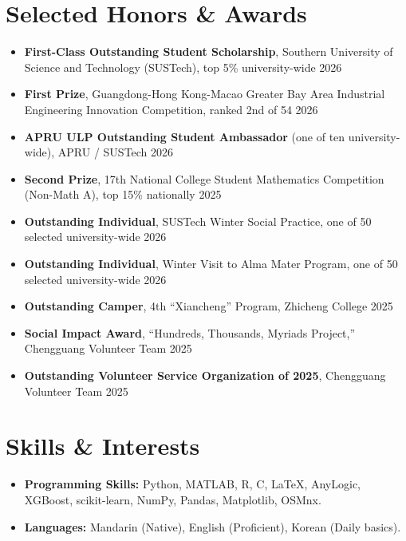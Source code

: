\documentclass[10pt,a4paper]{article}
\begin{document}
\section{Selected Honors \& Awards}
\begin{itemize}
    \item \textbf{First-Class Outstanding Student Scholarship}, Southern University of Science and Technology (SUSTech), top 5\% university-wide \hfill 2026
    \item \textbf{First Prize}, Guangdong-Hong Kong-Macao Greater Bay Area Industrial Engineering Innovation Competition, ranked 2nd of 54 \hfill 2026
    \item \textbf{APRU ULP Outstanding Student Ambassador} (one of ten university-wide), APRU / SUSTech \hfill 2026
    \item \textbf{Second Prize}, 17th National College Student Mathematics Competition (Non-Math A), top 15\% nationally \hfill 2025
    \item \textbf{Outstanding Individual}, SUSTech Winter Social Practice, one of 50 selected university-wide \hfill 2026
    \item \textbf{Outstanding Individual}, Winter Visit to Alma Mater Program, one of 50 selected university-wide \hfill 2026
    \item \textbf{Outstanding Camper}, 4th ``Xiancheng'' Program, Zhicheng College \hfill 2025
    \item \textbf{Social Impact Award}, ``Hundreds, Thousands, Myriads Project,'' Chengguang Volunteer Team \hfill 2025
    \item \textbf{Outstanding Volunteer Service Organization of 2025}, Chengguang Volunteer Team \hfill 2025
\end{itemize}

\section{Skills \& Interests}
\begin{itemize}
    \item \textbf{Programming Skills:} Python, MATLAB, R, C, LaTeX, AnyLogic, XGBoost, scikit-learn, NumPy, Pandas, Matplotlib, OSMnx.
    \item \textbf{Languages:} Mandarin (Native), English (Proficient), Korean (Daily basics).
\end{itemize}
\end{document}
